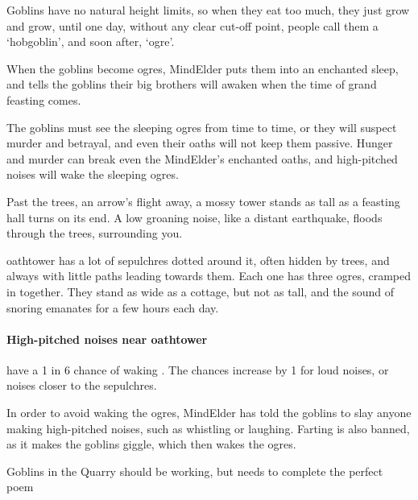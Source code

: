 \begin{multicols}{2}
\begin{exampletext}
  Goblins have no natural height limits, so when they eat too much, they just grow and grow, until one day, without any clear cut-off point, people call them a `hobgoblin', and soon after, `\gls{ogre}'.

  When the goblins become \glspl{ogre}, \gls{MindElder} puts them into an enchanted sleep, and tells the goblins their big brothers will awaken when the time of grand feasting comes.

  The goblins must see the sleeping \glspl{ogre} from time to time, or they will suspect murder and betrayal, and even their oaths will not keep them passive.
  Hunger and murder can break even the \gls{MindElder}'s enchanted oaths, and high-pitched noises will wake the sleeping \glspl{ogre}.
\end{exampletext}

\begin{boxtext}
  Past the trees, an arrow's flight away, a mossy tower stands as tall as a feasting hall turns on its end.
  A low groaning noise, like a distant earthquake, floods through the trees, surrounding you.
\end{boxtext}

\Gls{oathtower} has a lot of sepulchres dotted around it, often hidden by trees, and always with little paths leading towards them.
Each one has three \glspl{ogre}, cramped in together.
They stand as wide as a cottage, but not as tall, and the sound of snoring emanates for a few hours each day.

\paragraph{High-pitched noises near \gls{oathtower}}
have a 1 in 6 chance of waking .
The chances increase by 1 for loud noises, or noises closer to the sepulchres.

In order to avoid waking the \glspl{ogre}, \gls{MindElder} has told the goblins to slay anyone making high-pitched noises, such as whistling or laughing.
Farting is also banned, as it makes the goblins giggle, which then wakes the \glspl{ogre}.



{Goblins in the Quarry}%
{ should be working, but needs to complete the perfect poem}%
\label{goblinQuarry}


\end{multicols}
